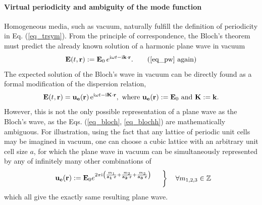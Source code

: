 \paragraph{Virtual periodicity and ambiguity of the mode function}%
Homogeneous media, such as vacuum, naturally fulfill the definition of periodicity in Eq. (\ref{eq_trsym}).
From the principle of correspondence, the Bloch's theorem must predict
the already known solution of a harmonic plane wave in vacuum
\begin{equation} \E(t, \rr) := \E_0\, e^{\ii\omega t - \ii\kk\cdot\rr}. \tag{\ref{eq_pw} \again} \end{equation}
The expected solution of the Bloch's wave in vacuum can be directly found as a formal modification of the dispersion relation,
\begin{equation}  
\mathbf{E}(t, {\mathbf{r}}) = \mathbf{u_e}({\mathbf{r}})\,\mathrm{e}^{{\mathrm i}\omega t - {\mathrm i}{\mathbf{K}}\cdot{\mathbf{r}}}, \text{ where } \mathbf{u_e}({\mathbf{r}}) := \mathbf{E}_0  \text{ and } {\mathbf{K}} := {\mathbf{k}}.
\label{eq_blochvac}
\end{equation}
However, this is not the only possible representation of a plane wave as the Bloch's wave, as the Eqs. (\ref{eq_bloch}, \ref{eq_blochh}) are mathematically ambiguous. 
For illustration, using the fact that any lattice of periodic unit cells may be imagined in vacuum, one can choose a cubic lattice with an arbitrary unit cell size $a$, %
for which the plane wave in vacuum can be simultaneously represented by any of infinitely many other combinations of
\begin{equation} 
\left.  \begin{array}{cc}
	\mathbf{u_{e}}(\rr) := \E_0 e^{2\pi\ii \left(\frac{m_1}{\ava\cdot\rr} + \frac{m_2}{\avb\cdot\rr} + \frac{m_3}{\avc\cdot\rr} \right)} \vspace{2mm} \\ %
\end{array}\quad \right\} \quad \forall m_{1,2,3} \in \mathbb{Z}
\label{eq_blochvac2}
\end{equation}
which all 
give the exactly same resulting plane wave. 

